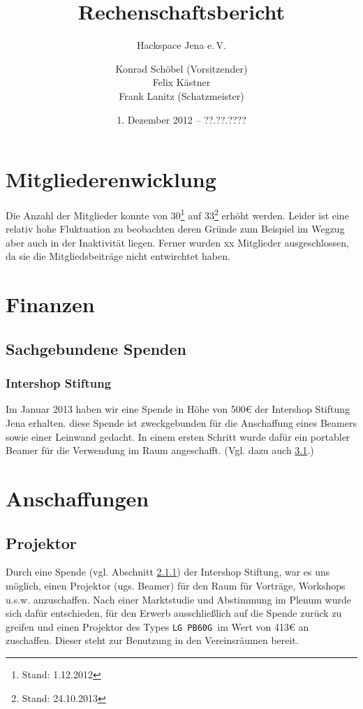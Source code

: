 \documentclass[10pt,DIV16]{scrartcl}
\title{Rechenschaftsbericht}
\subtitle{Hackspace Jena e.\,V.}
\author{%
	Konrad Schöbel (Vorsitzender)\\
	Felix Kästner\\
	Frank Lanitz (Schatzmeister)
}
\date{1. Dezember 2012 -- ??.??.????}
\begin{document}
\maketitle{}

\tableofcontents{}

\newpage{}

\section{Mitgliederenwicklung}

Die Anzahl der Mitglieder konnte von 30\footnote{Stand: 1.12.2012} auf
33\footnote{Stand: 24.10.2013} erhöht werden. Leider ist eine relativ
hohe Fluktuation zu beobachten deren Gründe zum Beispiel im Wegzug aber
auch in der Inaktivität liegen. Ferner wurden xx Mitglieder
ausgeschlossen, da sie die Mitgliedsbeiträge nicht entwirchtet haben.

\section{Finanzen}

\subsection{Sachgebundene Spenden}
\subsubsection{Intershop Stiftung}
\label{sec:iss-spende}
Im Januar 2013 haben wir eine Spende in Höhe von 500\euro{} der Intershop
Stiftung Jena erhalten. diese Spende ist zweckgebunden für die
Anschaffung eines Beamers sowie einer Leinwand gedacht. In einem
ersten Schritt wurde dafür ein portabler Beamer für die Verwendung
im Raum angeschafft. (Vgl. dazu auch \ref{sec:beamerkauf}.)

\section{Anschaffungen}

\subsection{Projektor}
\label{sec:beamerkauf}

Durch eine Spende (vgl. Abschnitt \ref{sec:iss-spende}) der
Intershop Stiftung, war es uns möglich, einen Projektor (ugs. Beamer) für den Raum
für Vorträge, Workshops u.s.w. anzuschaffen. Nach einer Marktstudie
und Abstimmung im Plenum wurde sich dafür entschieden, für den
Erwerb ausschließlich auf die Spende zurück zu greifen und einen
Projektor des Types \texttt{LG PB60G }im Wert von 413\euro{} an
zuschaffen. Dieser steht zur Benutzung in den Vereinsräumen bereit.
\end{document}
